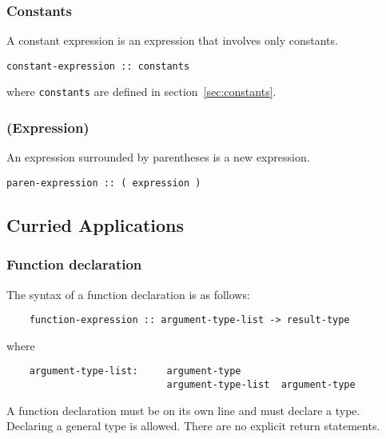 \subsubsection{Constants}
A constant expression is an expression that involves only constants. 
\begin{verbatim}
constant-expression :: constants
\end{verbatim}
where \texttt{constants} are defined in section~\ref{sec:constants}.

\subsubsection{(Expression)}
An expression surrounded by parentheses is a new expression.
\begin{verbatim}
paren-expression :: ( expression )
\end{verbatim}


\subsection{Curried Applications}

    \subsubsection{Function declaration}
    The syntax of a function declaration is as follows: 
    \begin{verbatim} 
    function-expression :: argument-type-list -> result-type 
    \end{verbatim} 
    where
    \begin{verbatim}
    argument-type-list:     argument-type
                            argument-type-list  argument-type
    \end{verbatim} 
A function declaration must be on its own line and must declare a type. Declaring a general type is allowed. There are no explicit return statements.
  
